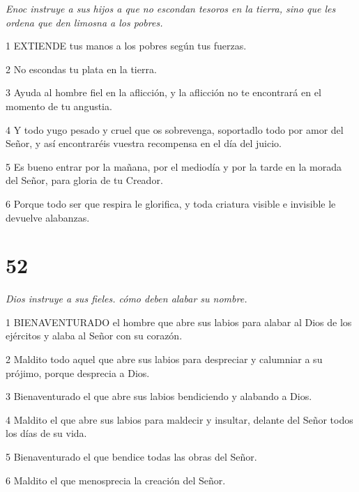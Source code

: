 \par \textit{Enoc instruye a sus hijos a que no escondan tesoros en la tierra, sino que les ordena que den limosna a los pobres.}

\par 1 EXTIENDE tus manos a los pobres según tus fuerzas.

\par 2 No escondas tu plata en la tierra.

\par 3 Ayuda al hombre fiel en la aflicción, y la aflicción no te encontrará en el momento de tu angustia.

\par 4 Y todo yugo pesado y cruel que os sobrevenga, soportadlo todo por amor del Señor, y así encontraréis vuestra recompensa en el día del juicio.

\par 5 Es bueno entrar por la mañana, por el mediodía y por la tarde en la morada del Señor, para gloria de tu Creador.

\par 6 Porque todo ser que respira le glorifica, y toda criatura visible e invisible le devuelve alabanzas.

\chapter{52}

\par \textit{Dios instruye a sus fieles. cómo deben alabar su nombre.}

\par 1 BIENAVENTURADO el hombre que abre sus labios para alabar al Dios de los ejércitos y alaba al Señor con su corazón.

\par 2 Maldito todo aquel que abre sus labios para despreciar y calumniar a su prójimo, porque desprecia a Dios.

\par 3 Bienaventurado el que abre sus labios bendiciendo y alabando a Dios.

\par 4 Maldito el que abre sus labios para maldecir y insultar, delante del Señor todos los días de su vida.

\par 5 Bienaventurado el que bendice todas las obras del Señor.

\par 6 Maldito el que menosprecia la creación del Señor.

